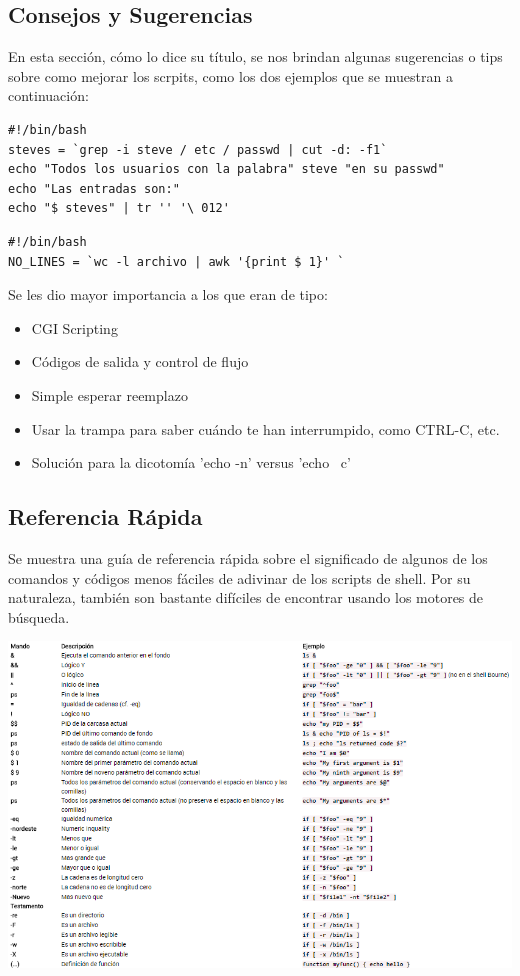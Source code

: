 \documentclass{article}
\begin{document}
\subsection{Consejos y Sugerencias}
En esta sección, cómo lo dice su título, se nos brindan algunas sugerencias o tips sobre como mejorar los scrpits, como los dos ejemplos que se muestran a continuación:

\begin{verbatim}
#!/bin/bash
steves = `grep -i steve / etc / passwd | cut -d: -f1` 
echo "Todos los usuarios con la palabra" steve "en su passwd" 
echo "Las entradas son:" 
echo "$ steves" | tr '' '\ 012'
\end{verbatim}

\begin{verbatim}
#!/bin/bash
NO_LINES = `wc -l archivo | awk '{print $ 1}' `
\end{verbatim}

Se les dio mayor importancia a los que eran de tipo:
\begin{itemize}
\item CGI Scripting

\item Códigos de salida y control de flujo

\item Simple esperar reemplazo

\item Usar la trampa para saber cuándo te han interrumpido, como CTRL-C, etc.

\item Solución para la dicotomía 'echo -n' versus 'echo \ c'
\end{itemize}

\subsection{Referencia Rápida}
Se muestra una guía de referencia rápida sobre el significado de algunos de los comandos y códigos menos fáciles de adivinar de los scripts de shell. Por su naturaleza, también son bastante difíciles de encontrar usando los motores de búsqueda.
\begin{center}
 \includegraphics[width=1\textwidth]{referencias.PNG}
\end{center}
\end{document}
